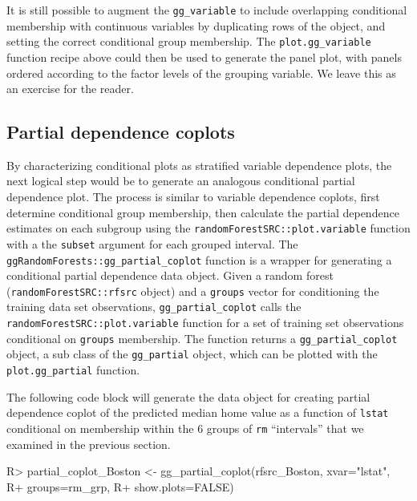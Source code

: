 \documentclass[article]{jss}
\begin{document}
It is still possible to augment the \texttt{gg\_variable} to include
overlapping conditional membership with continuous variables by
duplicating rows of the object, and setting the correct conditional
group membership. The \texttt{plot.gg\_variable} function recipe above
could then be used to generate the panel plot, with panels ordered
according to the factor levels of the grouping variable. We leave this
as an exercise for the reader.

\subsection{Partial dependence
coplots}\label{partial-dependence-coplots}

By characterizing conditional plots as stratified variable dependence
plots, the next logical step would be to generate an analogous
conditional partial dependence plot. The process is similar to variable
dependence coplots, first determine conditional group membership, then
calculate the partial dependence estimates on each subgroup using the
\texttt{randomForestSRC::plot.variable} function with a the
\texttt{subset} argument for each grouped interval. The
\texttt{ggRandomForests::gg\_partial\_coplot} function is a wrapper for
generating a conditional partial dependence data object. Given a random
forest (\texttt{randomForestSRC::rfsrc} object) and a \texttt{groups}
vector for conditioning the training data set observations,
\texttt{gg\_partial\_coplot} calls the
\texttt{randomForestSRC::plot.variable} function for a set of training
set observations conditional on \texttt{groups} membership. The function
returns a \texttt{gg\_partial\_coplot} object, a sub class of the
\texttt{gg\_partial} object, which can be plotted with the
\texttt{plot.gg\_partial} function.

The following code block will generate the data object for creating
partial dependence coplot of the predicted median home value as a
function of \texttt{lstat} conditional on membership within the 6 groups
of \texttt{rm} ``intervals'' that we examined in the previous section.

\begin{CodeChunk}

\begin{CodeInput}
R> partial_coplot_Boston <- gg_partial_coplot(rfsrc_Boston, xvar="lstat", 
R+                                            groups=rm_grp,
R+                                            show.plots=FALSE)
\end{CodeInput}
\end{CodeChunk}
\end{document}
